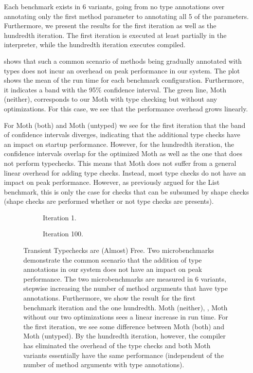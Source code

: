 Each benchmark exists in 6 variants, going from no type annotations
over annotating only the first method parameter to annotating all 5 of the parameters.
Furthermore, we present the results for the first iteration as well as the hundredth iteration.
The first iteration is executed at least partially in the interpreter,
while the hundredth iteration executes compiled.

 shows that such a common scenario of methods being 
gradually annotated with types
does not incur an overhead on peak performance in our system.
The plot shows the mean of the run time for each benchmark configuration.
Furthermore, it indicates a band with the 95\% confidence interval.
The green line, Moth (neither), corresponds to our Moth with type checking
but without any optimizations.
For this case, we see that the performance overhead grows linearly.

For Moth (both) and Moth (untyped) we see for the first iteration that
the band of confidence intervals diverges, indicating that the additional type
checks have an impact on startup performance.
However, for the hundredth iteration, the confidence intervals overlap
for the optimized Moth as well as the one that does not perform typechecks.
This means that Moth does not suffer from
a general linear overhead for adding type checks.
Instead, most type checks do not have an impact on peak performance.
However, as previously argued for the List benchmark,
this is only the case for checks that can be subsumed by shape checks
(shape checks are performed whether or not type checks are presents).

\begin{figure}
  \begin{subfigure}[t]{0.5\textwidth}
    \centering
    \TypeCostFirstIt{}
    \caption{Iteration 1.}
  \end{subfigure}\hfill
  \begin{subfigure}[t]{0.5\textwidth}
    \centering
    \TypeCostLastIt{}
    \caption{Iteration 100.}
  \end{subfigure}

  \caption{Transient Typechecks are (Almost) Free.
    Two microbenchmarks demonstrate the common scenario that the addition
    of type annotations in our system does not have an impact on peak performance.
    The two microbenchmarks are measured in 6 variants, stepwise increasing the number
    of method arguments that have type annotations.
    Furthermore, we show the result for the first benchmark iteration and the
    one hundredth.
    Moth (neither), \ie, Moth without our two optimizations sees a linear increase in run time.
    For the first iteration, we see some difference between Moth (both) and Moth (untyped).
    By the hundredth iteration, however, the compiler has eliminated
    the overhead of the type checks
    and both Moth variants essentially have the same performance
    (independent of the number of method arguments with type annotations).}
	\label{fig:type-cost-micro}
\end{figure}



